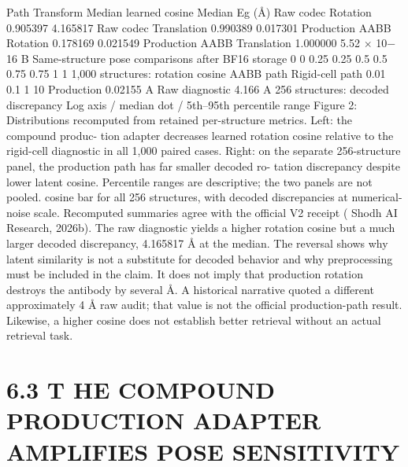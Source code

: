 \documentclass[11pt]{article}
\begin{document}
Path Transform Median learned cosine Median Eg (Å)
Raw codec Rotation 0.905397 4.165817
Raw codec Translation 0.990389 0.017301
Production AABB Rotation 0.178169 0.021549
Production AABB Translation 1.000000 5.52 \ensuremath{\times} 10\ensuremath{-}16
B  Same-structure pose comparisons after BF16 storage
0
0
0.25
0.25
0.5
0.5
0.75
0.75
1
1
1,000 structures: rotation cosine
AABB path
Rigid-cell path
0.01
0.1
1
10
Production
0.02155 A
Raw diagnostic
4.166 A
256 structures: decoded discrepancy
Log axis / median dot / 5th--95th percentile range
Figure 2: Distributions recomputed from retained per-structure metrics. Left: the compound produc-
tion adapter decreases learned rotation cosine relative to the rigid-cell diagnostic in all 1,000 paired
cases. Right: on the separate 256-structure panel, the production path has far smaller decoded ro-
tation discrepancy despite lower latent cosine. Percentile ranges are descriptive; the two panels are
not pooled.
cosine bar for all 256 structures, with decoded discrepancies at numerical-noise scale. Recomputed
summaries agree with the official V2 receipt ( Shodh AI Research, 2026b).
The raw diagnostic yields a higher rotation cosine but a much larger decoded discrepancy,
4.165817 Å at the median. The reversal shows why latent similarity is not a substitute for decoded
behavior and why preprocessing must be included in the claim. It does not imply that production
rotation destroys the antibody by several Å. A historical narrative quoted a different approximately
4 Å raw audit; that value is not the official production-path result. Likewise, a higher cosine does
not establish better retrieval without an actual retrieval task.

\section*{6.3 T HE COMPOUND PRODUCTION ADAPTER AMPLIFIES POSE SENSITIVITY}
\end{document}
